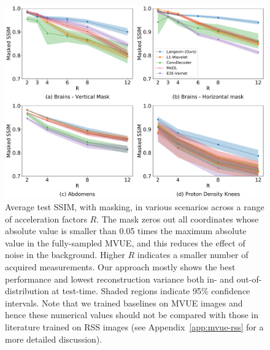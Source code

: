\begin{figure}
    \centering
    \includegraphics[width=\columnwidth]{main-masked-ssim-comp.pdf}
    \caption{\small Average test SSIM, with masking, in various scenarios across a range of acceleration factors $R$. The mask zeros out all coordinates whose absolute value is smaller than 0.05 times the maximum absolute value in the fully-sampled MVUE, and this reduces the effect of noise in the background. Higher $R$ indicates a smaller number of acquired measurements. Our approach mostly shows the best performance and lowest reconstruction variance both in- and out-of-distribution at test-time. Shaded regions indicate 95\% confidence intervals. Note that we trained baselines on MVUE images and hence these numerical values should not be compared with those in literature trained on RSS images (see Appendix~\ref{app:mvue-rss} for a more detailed discussion).}
    \label{fig:main-masked-ssim}
\end{figure}


